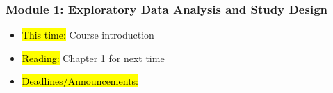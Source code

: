 
\begin{frame}
    \frametitle{Module 1: Exploratory Data Analysis and Study Design}
    \begin{itemize}
        \item \hl{This time: }Course introduction
        \item \hl{Reading: }Chapter 1 for next time
        \item \hl{Deadlines/Announcements: }
    \end{itemize}
    
\end{frame}
    